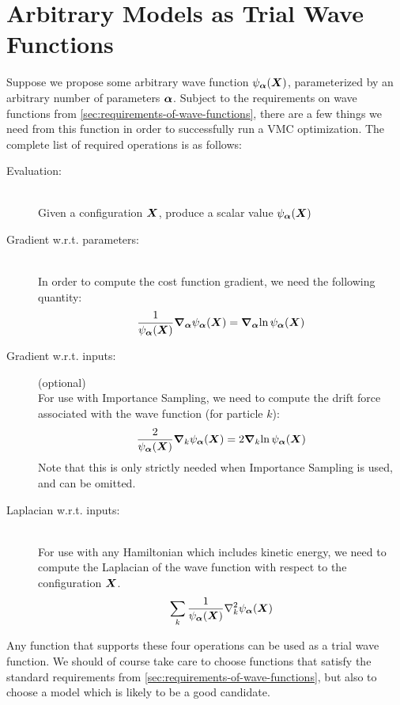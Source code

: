\documentclass[Thesis.tex]{subfiles}
\begin{document}
\section{Arbitrary Models as Trial Wave Functions}

Suppose we propose some arbitrary wave function $\psi_{\bm{\alpha}}(\bm{X})$, parameterized
by an arbitrary number of parameters $\bm{\alpha}$. Subject to the
requirements on wave functions from \cref{sec:requirements-of-wave-functions},
there are a few things we need from this function in order to successfully run a
VMC optimization. The complete list of required operations is as follows:

\begin{description}
\item[Evaluation:]\hfill\\
  Given a configuration $\bm{X}$, produce a scalar value $\psi_{\bm{\alpha}}(\bm{X})$
\item[Gradient w.r.t. parameters:]\hfill\\
  In order to compute the cost function gradient, we need the following
  quantity:
  \begin{align}
    \frac{1}{\psi_{\bm{\alpha}}(\bm{X})}\grad_{\bm{\alpha}}{\psi_{\bm{\alpha}}(\bm{X})} = \grad_{\bm{\alpha}}{\ln\psi_{\bm{\alpha}}(\bm{X})}
  \end{align}
\item[Gradient w.r.t. inputs:](optional)\hfill\\
  For use with Importance Sampling, we need to compute the drift force
  associated with the wave function (for particle $k$):
  \begin{align}
    \frac{2}{\psi_{\bm{\alpha}}(\bm{X})}\grad_k{\psi_{\bm{\alpha}}(\bm{X})} = 2 \grad_k{\ln\psi_{\bm{\alpha}}(\bm{X})}
  \end{align}
  Note that this is only strictly needed when Importance Sampling is used, and
  can be omitted.
\item[Laplacian w.r.t. inputs:]\hfill\\
  For use with any Hamiltonian which includes kinetic energy, we need to compute
  the Laplacian of the wave function with respect to the configuration $\bm{X}$.
  \begin{align}
    \sum_k\frac{1}{\psialpha(\vX)}\laplacian_k\psialpha(\vX)
  \end{align}
\end{description}

Any function that supports these four operations can be used as a trial wave
function. We should of course take care to choose functions that satisfy the
standard requirements from \cref{sec:requirements-of-wave-functions}, but also
to choose a model which is likely to be a good candidate.
\end{document}

